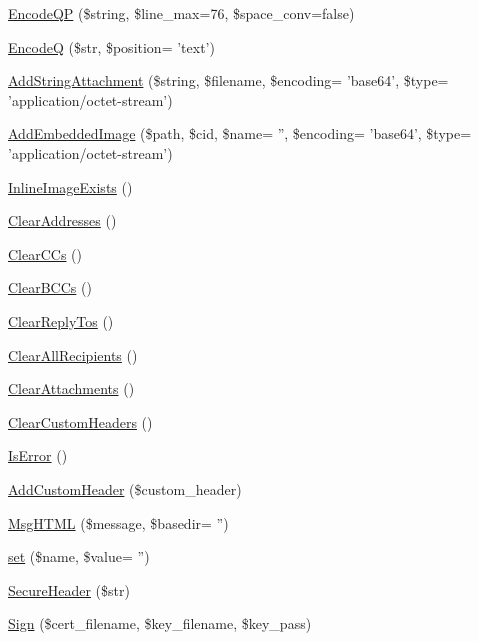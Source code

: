 \begin{DoxyCompactItemize}
\hyperlink{classPHPMailer_a5659b179a899473bbbc891c68d60813f}{Encode\+Q\+P} (\$string, \$line\+\_\+max=76, \$space\+\_\+conv=false)
\item 
\hyperlink{classPHPMailer_aad0e420b74b8d2909f1292332bf1bbb8}{Encode\+Q} (\$str, \$position= 'text')
\item 
\hyperlink{classPHPMailer_a92ef5134fdce5bd5fd24a723c508bf2b}{Add\+String\+Attachment} (\$string, \$filename, \$encoding= 'base64', \$type= 'application/octet-\/stream')
\item 
\hyperlink{classPHPMailer_ad65e08211e123fa3537e7af91d1e5fba}{Add\+Embedded\+Image} (\$path, \$cid, \$name= '', \$encoding= 'base64', \$type= 'application/octet-\/stream')
\item 
\hyperlink{classPHPMailer_a0167ed0843240553feb3cd4d5204f299}{Inline\+Image\+Exists} ()
\item 
\hyperlink{classPHPMailer_a0dddfa22e54f935641ed9a1ce9635f07}{Clear\+Addresses} ()
\item 
\hyperlink{classPHPMailer_a9304081ed2524139748d20c08076b2f5}{Clear\+C\+Cs} ()
\item 
\hyperlink{classPHPMailer_a94c5461b6fa875543fa1abbe41ac687b}{Clear\+B\+C\+Cs} ()
\item 
\hyperlink{classPHPMailer_aa2bbeddb9d5b19eb2202e715912b562f}{Clear\+Reply\+Tos} ()
\item 
\hyperlink{classPHPMailer_a5734ae30e8e523bdae2d8d92200ba34f}{Clear\+All\+Recipients} ()
\item 
\hyperlink{classPHPMailer_ad8f2cb3e17912028a5e39b4f23b2268c}{Clear\+Attachments} ()
\item 
\hyperlink{classPHPMailer_ac97c4987eefae07373a8becf2fdb4c6e}{Clear\+Custom\+Headers} ()
\item 
\hyperlink{classPHPMailer_a3ad69f21d5b0f390bd06e0696974b39c}{Is\+Error} ()
\item 
\hyperlink{classPHPMailer_a09a3f40782f26399efdec4f53f7f08f0}{Add\+Custom\+Header} (\$custom\+\_\+header)
\item 
\hyperlink{classPHPMailer_a747bfc31959d4454c6a6d7ce116d4e47}{Msg\+H\+T\+M\+L} (\$message, \$basedir= '')
\item 
\hyperlink{classPHPMailer_ad7dfabb6c5e91e298be2de2e78749a75}{set} (\$name, \$value= '')
\item 
\hyperlink{classPHPMailer_ac0c6f469479274f00a3715444b1a849a}{Secure\+Header} (\$str)
\item 
\hyperlink{classPHPMailer_a8ba196caee2ec44d60a34efbd2769719}{Sign} (\$cert\+\_\+filename, \$key\+\_\+filename, \$key\+\_\+pass)
\end{DoxyCompactItemize}
